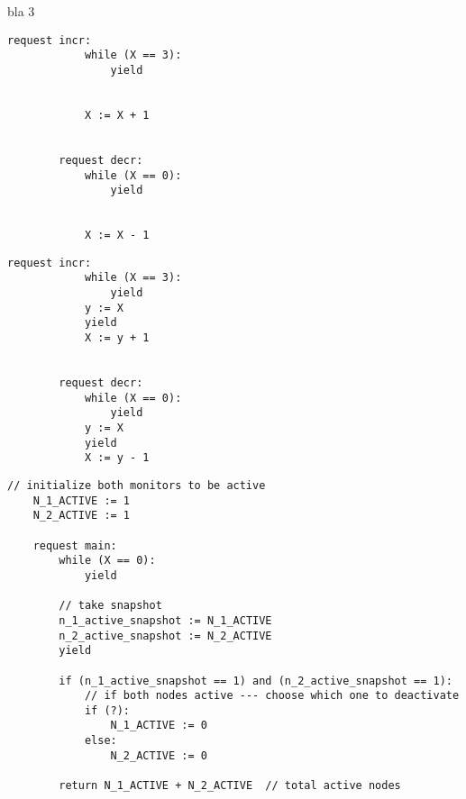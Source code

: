 \vspace{2em}
bla 3

\noindent
\begin{minipage}[t]{0.45\textwidth}
	\begin{lstlisting}[caption={Fred (serializable)}]
		request incr: 
		    while (X == 3):
		        yield
		        
		        
		    X := X + 1
		
		
		request decr: 
		    while (X == 0): 
		        yield
		        
		        
		    X := X - 1
	\end{lstlisting}
\end{minipage}
\hfill
\begin{minipage}[t]{0.45\textwidth}
	\begin{lstlisting}[caption={Fred2 (not serializable)}]
		request incr:
		    while (X == 3):
		        yield
		    y := X
		    yield
		    X := y + 1
		
		
		request decr: 
		    while (X == 0):
		        yield
		    y := X
		    yield
		    X := y - 1
	\end{lstlisting}
\end{minipage}
	

\begin{minipage}[t]{1.0\textwidth}
\begin{lstlisting}[caption={Snapshot-based monitor deactivation (not serializable, as it can return a sume of 0 active monitors)}]
	// initialize both monitors to be active
    N_1_ACTIVE := 1
    N_2_ACTIVE := 1
	
    request main:
        while (X == 0):
            yield
		
        // take snapshot
        n_1_active_snapshot := N_1_ACTIVE
        n_2_active_snapshot := N_2_ACTIVE
        yield
		
        if (n_1_active_snapshot == 1) and (n_2_active_snapshot == 1):
            // if both nodes active --- choose which one to deactivate 
            if (?): 
                N_1_ACTIVE := 0
            else:
                N_2_ACTIVE := 0

        return N_1_ACTIVE + N_2_ACTIVE  // total active nodes
\end{lstlisting}
\end{minipage}
	

	
\newpage